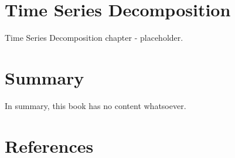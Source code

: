 \documentclass[
  letterpaper,
  DIV=11,
  numbers=noendperiod]{scrreprt}
\newlength{\cslhangindent}
\newlength{\cslentryspacingunit} %
\newenvironment{CSLReferences}[2] %
 {%
  \setlength{\parindent}{0pt}
  \ifodd #1
  \let\oldpar\par
  \def\par{\hangindent=\cslhangindent\oldpar}
  \fi
  \setlength{\parskip}{#2\cslentryspacingunit}
 }%
 {}
\begin{document}

\hypertarget{time-series-decomposition}{%
\chapter{Time Series Decomposition}\label{time-series-decomposition}}

Time Series Decomposition chapter - placeholder.


\hypertarget{summary}{%
\chapter{Summary}\label{summary}}

In summary, this book has no content whatsoever.


\hypertarget{references}{%
\chapter*{References}\label{references}}

\hypertarget{refs}{}
\begin{CSLReferences}{0}{0}
\end{CSLReferences}
\end{document}
